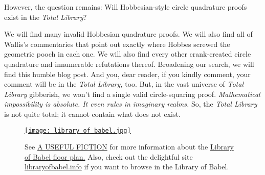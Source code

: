 However, the question remains: Will Hobbesian-style circle quadrature
proofs exist in the \emph{Total Library}?

We will find many invalid Hobbesian quadrature proofs. We will also find
all of Wallis's commentaries that point out exactly where Hobbes screwed
the geometric pooch in each one. We will also find every other
crank-created circle quadrature and innumerable refutations thereof.
Broadening our search, we will find this humble blog post. And you, dear
reader, if you kindly comment, your comment will be in the \emph{Total
Library,} too. But, in the vast universe of \emph{Total Library}
gibberish, we won't find a single valid circle-squaring proof.
\emph{Mathematical impossibility is absolute. It even rules in imaginary
realms.} So, the \emph{Total Library} is not quite total; it cannot
contain what does not exist.


\captionsetup[figure]{labelformat=empty}
\begin{SCfigure}
\centering
\href{https://onehundredpages.wordpress.com/2017/03/23/what-does-jorge-luis-borges-library-of-babel-look-like-an-accurate-illustration-created-with-3d-modeling-software/}{\texttt{[image: library\_of\_babel.jpg]}}
\caption{See \href{https://onehundredpages.wordpress.com/}{A USEFUL
FICTION} for more information about the
\href{https://onehundredpages.wordpress.com/2017/03/23/what-does-jorge-luis-borges-library-of-babel-look-like-an-accurate-illustration-created-with-3d-modeling-software/}{Library
of Babel floor plan.} Also, check out the delightful site
\href{https://libraryofbabel.info/}{libraryofbabel.info} if you want to
browse in the Library of Babel.}
\label{fig:8162X0}
\end{SCfigure}


%
 
